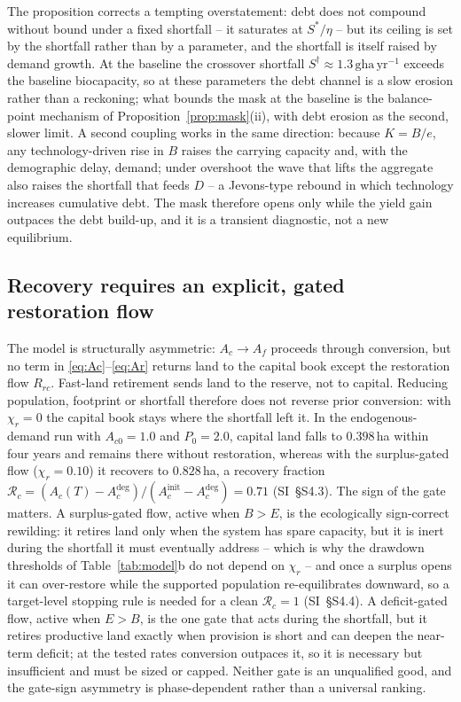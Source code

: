 The proposition corrects a tempting overstatement: debt does not compound without bound under a fixed shortfall -- it saturates at $S^*/\eta$ -- but its ceiling is set by the shortfall rather than by a parameter, and the shortfall is itself raised by demand growth. At the baseline the crossover shortfall $S^\dagger\approx1.3\,\mathrm{gha\,yr^{-1}}$ exceeds the baseline biocapacity, so at these parameters the debt channel is a slow erosion rather than a reckoning; what bounds the mask at the baseline is the balance-point mechanism of Proposition~\ref{prop:mask}(ii), with debt erosion as the second, slower limit. A second coupling works in the same direction: because $K=B/e$, any technology-driven rise in $B$ raises the carrying capacity and, with the demographic delay, demand; under overshoot the wave that lifts the aggregate also raises the shortfall that feeds $D$ -- a Jevons-type rebound in which technology increases cumulative debt. The mask therefore opens only while the yield gain outpaces the debt build-up, and it is a transient diagnostic, not a new equilibrium.

\subsection{Recovery requires an explicit, gated restoration flow}\label{sec:recovery}

The model is structurally asymmetric: $A_c\to A_f$ proceeds through conversion, but no term in \eqref{eq:Ac}--\eqref{eq:Ar} returns land to the capital book except the restoration flow $R_{rc}$. Fast-land retirement sends land to the reserve, not to capital. Reducing population, footprint or shortfall therefore does not reverse prior conversion: with $\chi_r=0$ the capital book stays where the shortfall left it. In the endogenous-demand run with $A_{c0}=1.0$ and $P_0=2.0$, capital land falls to $0.398$\,ha within four years and remains there without restoration, whereas with the surplus-gated flow ($\chi_r=0.10$) it recovers to $0.828$\,ha, a recovery fraction $\mathcal R_c=(A_c(T)-A_c^{\mathrm{deg}})/(A_c^{\mathrm{init}}-A_c^{\mathrm{deg}})=0.71$ (SI~\S S4.3). The sign of the gate matters. A surplus-gated flow, active when $B>E$, is the ecologically sign-correct rewilding: it retires land only when the system has spare capacity, but it is inert during the shortfall it must eventually address -- which is why the drawdown thresholds of Table~\ref{tab:model}b do not depend on $\chi_r$ -- and once a surplus opens it can over-restore while the supported population re-equilibrates downward, so a target-level stopping rule is needed for a clean $\mathcal R_c=1$ (SI~\S S4.4). A deficit-gated flow, active when $E>B$, is the one gate that acts during the shortfall, but it retires productive land exactly when provision is short and can deepen the near-term deficit; at the tested rates conversion outpaces it, so it is necessary but insufficient and must be sized or capped. Neither gate is an unqualified good, and the gate-sign asymmetry is phase-dependent rather than a universal ranking.

